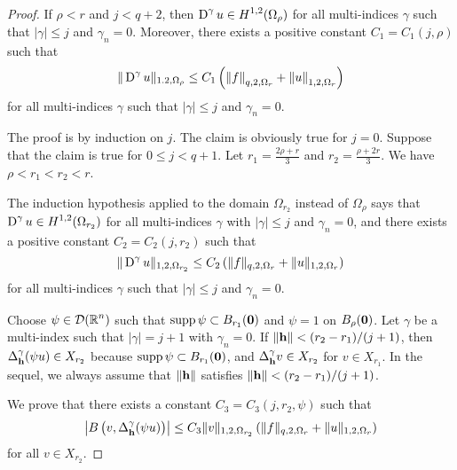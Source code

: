 \begin{proof}
 If $\rho<r$ and $j<q+2$, then
$\displaystyle \operatorname{D}^\gamma u \in H^{1,2}(\Omega_{\rho})$ for all
multi-indices $\gamma$ such that $|\gamma|\leq j$ and $\gamma_n =0$.
Moreover, there exists a positive constant $C_1 = C_1(j,\rho)$ such that
\begin{equation} \label{ell_reg_B1}
\|\operatorname{D}^\gamma u\|_{1.2,\Omega_\rho} \leq C_1
\left( \left\|f\right\|_{q,2,\Omega_r}
+ \left\|u\right\|_{1,2,\Omega_r} \right)
\end{equation}
for all multi-indices $\gamma$ such that $|\gamma| \leq j$ and $\gamma_n =0$.

The proof is by induction on $j$.  The claim is obviously true for
$j=0$.  Suppose that the claim is true for $0\leq j < q+1$.  Let
$\displaystyle r_1 = \frac{2\rho+r}{3}$ and
$\displaystyle r_2 = \frac{\rho+2r}{3}$.  We have $\rho <r_1<r_2< r$.

The induction hypothesis applied to the domain $\Omega_{r_2}$ instead
of $\Omega_\rho$ says that
$\displaystyle \operatorname{D}^\gamma u \in H^{1,2}(\Omega_{r_2})$ for
all multi-indices $\gamma$ with $|\gamma|\leq j$ and $\gamma_n = 0$, and
there exists a positive constant $C_2 = C_2(j,r_2)$ such that
\begin{equation} \label{ell_reg_B2}
\|\operatorname{D}^\gamma u\|_{1,2,\Omega_{r_2}} \leq C_2 \left( \|f\|_{q,2,\Omega_r}
+ \|u\|_{1,2,\Omega_r} \right)
\end{equation}
for all multi-indices $\gamma$ such that $|\gamma|\leq j$ and $\gamma_n =0$.

Choose $\displaystyle \psi \in \mathcal{D}(\mathbb{R}^n)$ such that
$\operatorname{supp} \psi \subset B_{r_1}(\mathbf{0})$ and $\psi = 1$ on $B_{\rho}(\mathbf{0})$.
Let $\gamma$ be a multi-index such that $|\gamma|=j+1$ with $\gamma_n=0$.
If $\displaystyle \|\mathbf{h}\| < (r_2-r_1)/(j+1)$,
then $\displaystyle \Delta_{\mathbf{h}}^\gamma (\psi u) \in X_{r_2}$ because
$\operatorname{supp} \psi \subset B_{r_1}(\mathbf{0})$, and
$\displaystyle \Delta_{\mathbf{h}}^\gamma v \in X_{r_2}$ for $v \in X_{r_1}$.  In
the sequel, we always assume that $\|\mathbf{h}\|$ satisfies
$\displaystyle \|\mathbf{h}\| < (r_2-r_1)/(j+1)$.

 We prove that there exists a constant
$C_3= C_3(j,r_2,\psi)$ such that
\begin{equation} \label{ell_reg_B3}
\left| B\left(v,\Delta_{\mathbf{h}}^\gamma(\psi u)\right) \right|
\leq C_3 \|v\|_{1,2,\Omega_{r_2}} \left( \|f\|_{q,2,\Omega_r} +
\|u\|_{1,2,\Omega_r} \right)
\end{equation}
for all $v \in X_{r_2}$.


\end{proof}
